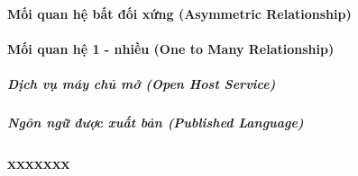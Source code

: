 \documentclass{article} %
\begin{document}
% 

\paragraph{Mối quan hệ bất đối xứng (Asymmetric Relationship)}

% 


% 


% 


% 

\paragraph{Mối quan hệ 1 - nhiều (One to Many Relationship)}

\subparagraph{Dịch vụ máy chủ mở (Open Host Service)}










 






\subparagraph{Ngôn ngữ được xuất bản (Published Language)}









 


%
%


\subsubsection{xxxxxxx}
% 
\end{document}

